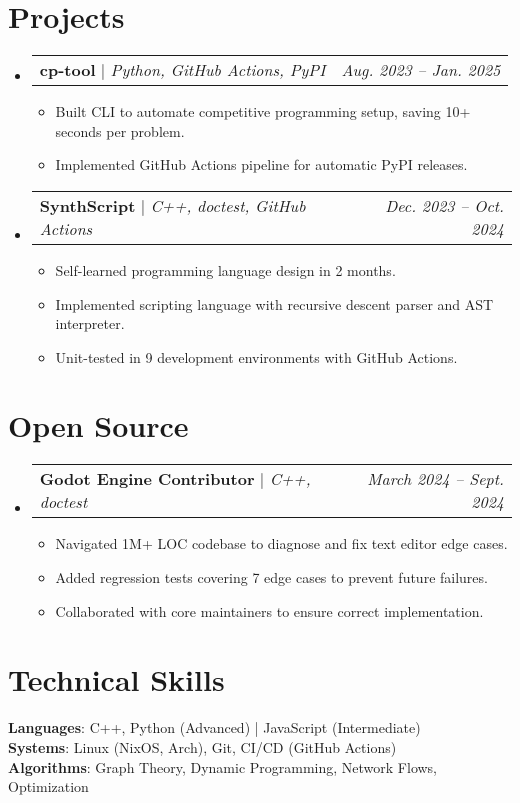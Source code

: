 \documentclass[letterpaper,11pt]{article}
\makeatletter
\newcommand{\resumeItem}[1]{
  \item\small{
    {#1 \vspace{-2pt}}
  }
}
\newcommand{\resumeProjectHeading}[2]{
    \item
    \begin{tabular*}{0.97\textwidth}{l@{\extracolsep{\fill}}r}
      \small#1 & \textit{#2} \\
    \end{tabular*}\vspace{-7pt}
}
\newcommand{\resumeSubHeadingListStart}{\begin{itemize}[leftmargin=0.15in, label={}]}
\newcommand{\resumeSubHeadingListEnd}{\end{itemize}}
\newcommand{\resumeItemListStart}{\begin{itemize}[leftmargin=0.23in]}
\newcommand{\resumeItemListEnd}{\end{itemize}\vspace{-5pt}}
\makeatother
\begin{document}
\section{Projects}
    \resumeSubHeadingListStart
      \resumeProjectHeading
          {\textbf{cp-tool} $|$ \emph{Python, GitHub Actions, PyPI}}{Aug. 2023 -- Jan. 2025}
          \resumeItemListStart
            \resumeItem{Built CLI to automate competitive programming setup, saving 10+ seconds per problem.}
            \resumeItem{Implemented GitHub Actions pipeline for automatic PyPI releases.}
          \resumeItemListEnd
      \resumeProjectHeading
          {\textbf{SynthScript} $|$ \emph{C++, doctest, GitHub Actions}}{Dec. 2023 -- Oct. 2024}
          \resumeItemListStart
            \resumeItem{Self-learned programming language design in 2 months.}
            \resumeItem{Implemented scripting language with recursive descent parser and AST interpreter.}
            \resumeItem{Unit-tested in 9 development environments with GitHub Actions.}
          \resumeItemListEnd
    \resumeSubHeadingListEnd


\section{Open Source}
    \resumeSubHeadingListStart
      \resumeProjectHeading
          {\textbf{Godot Engine Contributor} $|$ \emph{C++, doctest}}{March 2024 -- Sept. 2024}
          \resumeItemListStart
            \resumeItem{Navigated 1M+ LOC codebase to diagnose and fix text editor edge cases.}
            \resumeItem{Added regression tests covering 7 edge cases to prevent future failures.}
            \resumeItem{Collaborated with core maintainers to ensure correct implementation.}
          \resumeItemListEnd
    \resumeSubHeadingListEnd


\section{Technical Skills}
 \begin{itemize}[leftmargin=0.15in, label={}]
    \small{\item{
        \textbf{Languages}: C++, Python (Advanced) | JavaScript (Intermediate) \\
        \textbf{Systems}: Linux (NixOS, Arch), Git, CI/CD (GitHub Actions) \\
        \textbf{Algorithms}: Graph Theory, Dynamic Programming, Network Flows, Optimization \\
    }}
 \end{itemize}


\end{document}
